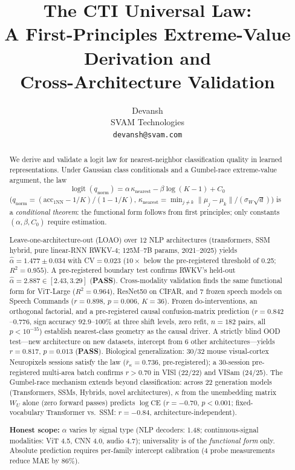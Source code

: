 \documentclass{article}
\title{The CTI Universal Law:\\
A First-Principles Extreme-Value Derivation and\\
Cross-Architecture Validation}
\author{Devansh \\
SVAM Technologies \\
\texttt{devansh@svam.com} \\
}
\DeclareMathOperator{\logit}{logit}
\begin{document}
\ifcolmsubmission
\linenumbers
\fi
\maketitle

\begin{abstract}
We derive and validate a logit law for nearest-neighbor classification quality in learned representations.
Under Gaussian class conditionals and a Gumbel-race extreme-value argument, the law
\begin{equation*}
\logit(q_{\mathrm{norm}})=\alpha\,\kappa_{\mathrm{nearest}}-\beta\log(K-1)+C_0
\end{equation*}
($q_{\mathrm{norm}}=(\mathrm{acc}_{1\mathrm{NN}}-1/K)/(1-1/K)$, $\kappa_{\mathrm{nearest}}=\min_{j\neq k}\|\mu_j-\mu_k\|/(\sigma_W\sqrt{d})$)
is a \emph{conditional theorem}: the functional form follows from first principles; only constants $(\alpha,\beta,C_0)$ require estimation.

Leave-one-architecture-out (LOAO) over 12 NLP architectures (transformers, SSM hybrid, pure linear-RNN RWKV-4; 125M--7B params, 2021--2025) yields $\hat\alpha=1.477\pm0.034$ with CV$=0.023$ ($10{\times}$ below the pre-registered threshold of 0.25; $R^2=0.955$).
A pre-registered boundary test confirms RWKV's held-out $\hat\alpha=2.887\in[2.43,3.29]$ (\textbf{PASS}).
Cross-modality validation finds the same functional form for ViT-Large ($R^2=0.964$), ResNet50 on CIFAR, and 7 frozen speech models on Speech Commands ($r=0.898$, $p=0.006$, $K=36$).
Frozen do-interventions, an orthogonal factorial, and a pre-registered causal confusion-matrix prediction ($r=0.842$--$0.776$, sign accuracy $92.9$--$100\%$ at three shift levels, zero refit, $n=182$ pairs, all $p<10^{-35}$) establish nearest-class geometry as the causal driver.
A strictly blind OOD test---new architecture on new datasets, intercept from 6 other architectures---yields $r=0.817$, $p=0.013$ (\textbf{PASS}).
Biological generalization: 30/32 mouse visual-cortex Neuropixels sessions satisfy the law ($\bar{r}_\kappa=0.736$, pre-registered); a 30-session pre-registered multi-area batch confirms $r>0.70$ in VISl (22/22) and VISam (24/25).
The Gumbel-race mechanism extends beyond classification: across 22 generation models (Transformers, SSMs, Hybrids, novel architectures), $\kappa$ from the unembedding matrix $W_U$ alone (zero forward passes) predicts $\log\mathrm{CE}$ ($r{=}{-}0.70$, $p{<}0.001$; fixed-vocabulary Transformer vs.\ SSM: $r{=}{-}0.84$, architecture-independent).

\textbf{Honest scope:} $\alpha$ varies by signal type (NLP decoders: 1.48; continuous-signal modalities: ViT 4.5, CNN 4.0, audio 4.7); universality is of the \emph{functional form} only.
Absolute prediction requires per-family intercept calibration (4 probe measurements reduce MAE by 86\%).
\end{abstract}
\end{document}
